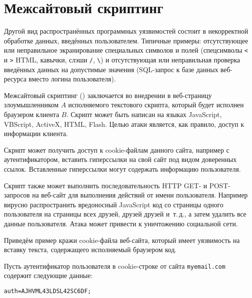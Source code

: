 \section{Межсайтовый скриптинг}

Другой вид распространённых программных уязвимостей состоит в некорректной обработке данных, введённых пользователем. Типичные примеры: отсутствующее или неправильное экранирование специальных символов и полей (спецсимволы \texttt{<} и \texttt{>} HTML, кавычки, слэши \texttt{/}, \texttt{\textbackslash}) и отсутствующая или неправильная проверка введённых данных на допустимые значения (SQL-запрос к базе данных веб-ресурса вместо логина пользователя).

Межсайтовый скриптинг () заключается во внедрении в веб-страницу злоумышленником $A$ исполняемого текстового скрипта, который будет исполнен браузером клиента $B$. Скрипт может быть написан на языках JavaScript, VBScript, ActiveX, HTML, Flash. Целью атаки является, как правило, доступ к информации клиента.

Скрипт может получить доступ к cookie-файлам данного сайта, например с аутентификатором, вставить гиперссылки на свой сайт под видом доверенных ссылок. Вставленные гиперссылки могут содержать информацию пользователя.

Скрипт также может выполнить последовательность HTTP GET- и POST-запросов на веб-сайт для выполнения действий от имени пользователя. Например вирусно распространить вредоносный JavaScript код со страницы одного пользователя на страницы всех друзей, друзей друзей и~т.\,д., а затем удалить все данные пользователя. Атака может привести к уничтожению социальной сети.

Приведём пример кражи cookie-файла веб-сайта, который имеет уязвимость на вставку текста, содержащего исполняемый браузером код.


Пусть аутентификатор пользователя в cookie-строке от сайта \texttt{myemail.com} содержит следующие данные:

\begin{center} \begin{verbatim}
auth=AJHVML43LDSL42SC6DF;
\end{verbatim} \end{center}

